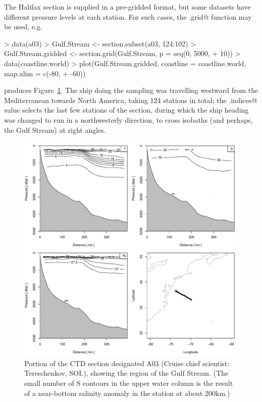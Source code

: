 \documentclass{article}
\begin{document}

The Halifax section is supplied in a pre-gridded format, but some datasets have
different pressure levels at each station.  For such cases, the
\verb@section.grid@ function may be used, e.g.
\begin{Schunk}
\begin{Sinput}
> data(a03)
> Gulf.Stream <- section.subset(a03, 124:102)
> Gulf.Stream.gridded <- section.grid(Gulf.Stream, p = seq(0, 5000, 
+     10))
> data(coastline.world)
> plot(Gulf.Stream.gridded, coastline = coastline.world, map.xlim = c(-80, 
+     -60))
\end{Sinput}
\end{Schunk}
produces Figure~\ref{fig:sectiona03}.  The ship doing the sampling was
travelling westward from the Mediterranean towards North America, taking 124
stations in total; the \verb@station.indices@ value selects the last few
stations of the section, during which the ship heading was changed to run in a
northwesterly direction, to cross isobaths (and perhaps, the Gulf Stream) at
right angles.

\begin{figure}
\begin{center}
\includegraphics{oce-sectionfiga03}
\end{center}
\caption{\label{fig:sectiona03}
Portion of the CTD section designated A03 (Cruise chief scientist: Tereschenkov, SOI.), showing the region of the Gulf Stream.  (The small number of S contours
in the upper water column is the result of a near-bottom salinity anomaly
in the station at about 200km.)
}
\end{figure}
\end{document}
